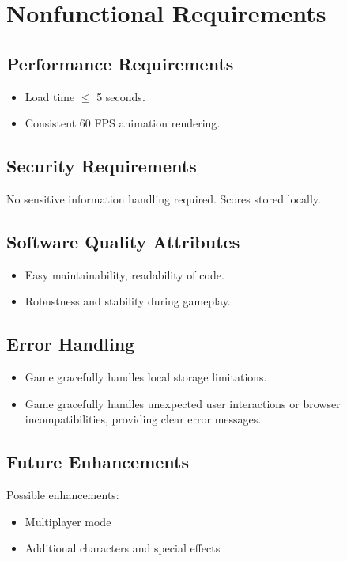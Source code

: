 \documentclass{scrreprt}
\begin{document}
\chapter{Nonfunctional Requirements}

\section{Performance Requirements}
\begin{itemize}
    \item Load time $\leq$ 5 seconds.
    \item Consistent 60 FPS animation rendering.
\end{itemize}

\section{Security Requirements}
No sensitive information handling required. Scores stored locally.

\section{Software Quality Attributes}
\begin{itemize}
    \item Easy maintainability, readability of code.
    \item Robustness and stability during gameplay.
\end{itemize}

\section{Error Handling}
\begin{itemize}
    \item Game gracefully handles local storage limitations.
    \item Game gracefully handles unexpected user interactions or browser incompatibilities, providing clear error messages.
\end{itemize}

\section{Future Enhancements}
Possible enhancements:
\begin{itemize}
    \item Multiplayer mode
    \item Additional characters and special effects
\end{itemize}
\end{document}
